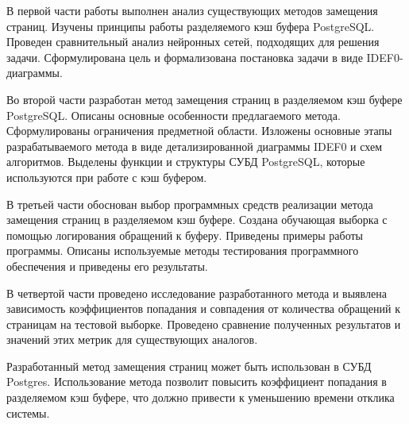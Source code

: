 В первой части работы выполнен анализ существующих методов замещения страниц. 
Изучены принципы работы разделяемого кэш буфера PostgreSQL.
Проведен сравнительный анализ нейронных сетей, подходящих для решения задачи.
Сформулирована цель и формализована постановка задачи в виде IDEF0-диаграммы.

Во второй части разработан метод замещения страниц в разделяемом кэш буфере PostgreSQL.
Описаны основные особенности предлагаемого метода.
Сформулированы ограничения предметной области.
Изложены основные этапы разрабатываемого метода в виде детализированной диаграммы IDEF0 и схем алгоритмов.
Выделены функции и структуры СУБД PostgreSQL, которые используются при работе с кэш буфером.

В третьей части обоснован выбор программных средств реализации метода замещения страниц в разделяемом кэш буфере.
Создана обучающая выборка с помощью логирования обращений к буферу. 
Приведены примеры работы программы. 
Описаны используемые методы тестирования программного обеспечения и приведены его результаты.

В четвертой части проведено исследование разработанного метода и выявлена зависимость коэффициентов попадания и совпадения от количества обращений к страницам на тестовой выборке.
Проведено сравнение полученных результатов и значений этих метрик для существующих аналогов.

Разработанный метод замещения страниц может быть использован в СУБД Postgres. 
Использование метода позволит повысить коэффициент попадания в разделяемом кэш буфере, что должно привести к уменьшению времени отклика системы. 